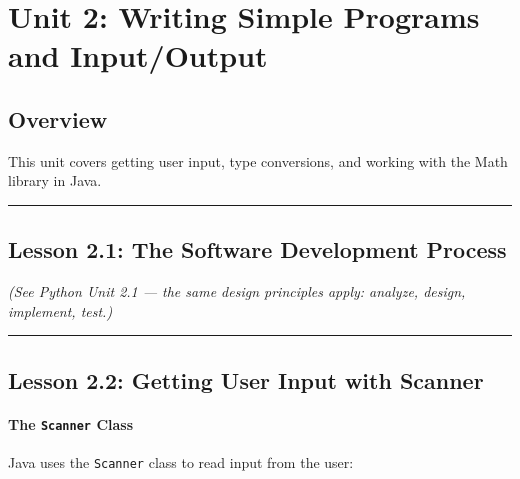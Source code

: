 \documentclass[
  justified,
  openright,
]{tufte-book}
\let\subsubsection\paragraph
\let\paragraph\paragraph
\let\subsubsection\paragraph
\let\paragraph\paragraph
\begin{document}
\newpage

\section{Unit 2: Writing Simple Programs and
Input/Output}\label{unit-2-writing-simple-programs-and-inputoutput}

\subsection{Overview}\label{overview-2}

This unit covers getting user input, type conversions, and working with
the Math library in Java.

\begin{center}\rule{0.5\linewidth}{0.5pt}\end{center}

\subsection{Lesson 2.1: The Software Development
Process}\label{lesson-2.1-the-software-development-process}

\emph{(See Python Unit 2.1 --- the same design principles apply:
analyze, design, implement, test.)}

\begin{center}\rule{0.5\linewidth}{0.5pt}\end{center}

\subsection{Lesson 2.2: Getting User Input with
Scanner}\label{lesson-2.2-getting-user-input-with-scanner}

\subsubsection{\texorpdfstring{The \texttt{Scanner}
Class}{The Scanner Class}}\label{the-scanner-class}

Java uses the \texttt{Scanner} class to read input from the user:
\end{document}
